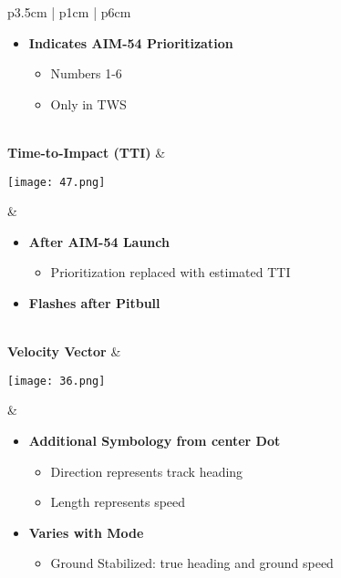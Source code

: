 \documentclass[8pt,usenames,dvipsnames,twoside]{article}
\begin{document}
\begin{center}
\begin{longtable}{p{3.5cm} | p{1cm} |  p{6cm}}
\begin{minipage}[t]{\linewidth}
\begin{itemize}
						\item \textbf{Indicates AIM-54 Prioritization}
						\begin{itemize}
							\item Numbers 1-6
							\item Only in TWS
						\end{itemize}
					\end{itemize}
				\end{minipage} \\
				\midrule
				\textbf{Time-to-Impact (TTI)} &
				\begin{minipage}[t]{\linewidth}
					\vspace{-7pt}
					\centering
					\texttt{[image: 47.png]}
				\end{minipage} &  
				\begin{minipage}[t]{\linewidth}
					\vspace{-7pt}
					\begin{itemize}
						\item \textbf{After AIM-54 Launch}
						\begin{itemize}
							\item Prioritization replaced with estimated TTI
						\end{itemize}
						\item \textbf{Flashes after Pitbull}
					\end{itemize}
				\end{minipage} \\
				\midrule
				\textbf{Velocity Vector} &
				\begin{minipage}[t]{\linewidth}
					\vspace{-7pt}
					\centering
					\texttt{[image: 36.png]}
				\end{minipage} &  
				\begin{minipage}[t]{\linewidth}
					\vspace{-7pt}
					\begin{itemize}
						\item \textbf{Additional Symbology from center Dot}
						\begin{itemize}
							\item Direction represents track heading
							\item Length represents speed
						\end{itemize}
						\item \textbf{Varies with Mode}
						\begin{itemize}
							\item Ground Stabilized: true heading and ground speed

\end{itemize}
\end{itemize}
\end{minipage}
\end{longtable}
\end{center}
\end{document}
